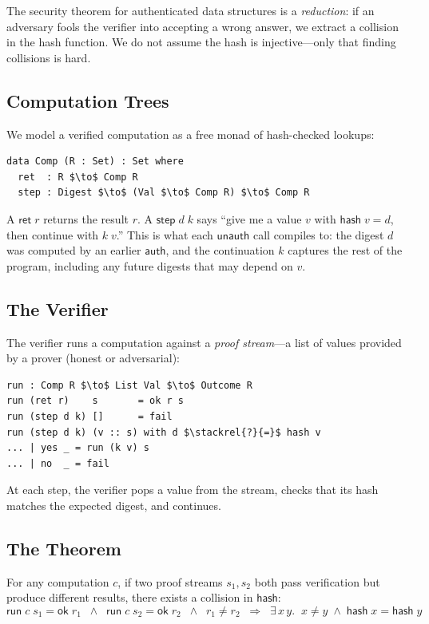 \documentclass[acmsmall,screen,review,anonymous]{acmart}
\begin{document}
The security theorem for authenticated data structures is a
\emph{reduction}: if an adversary fools the verifier into accepting a
wrong answer, we extract a collision in the hash function.  We do not
assume the hash is injective---only that finding collisions is hard.

\subsection{Computation Trees}

We model a verified computation as a free monad of hash-checked
lookups:
%
\begin{lstlisting}
data Comp (R : Set) : Set where
  ret  : R $\to$ Comp R
  step : Digest $\to$ (Val $\to$ Comp R) $\to$ Comp R
\end{lstlisting}
%
A $\mathsf{ret}\;r$ returns the result $r$.  A
$\mathsf{step}\;d\;k$ says ``give me a value $v$ with
$\mathsf{hash}\;v = d$, then continue with $k\;v$.''  This is what
each $\mathsf{unauth}$ call compiles to: the digest $d$ was computed
by an earlier $\mathsf{auth}$, and the continuation $k$ captures the
rest of the program, including any future digests that may depend on
$v$.

\subsection{The Verifier}

The verifier runs a computation against a \emph{proof stream}---a list
of values provided by a prover (honest or adversarial):
%
\begin{lstlisting}
run : Comp R $\to$ List Val $\to$ Outcome R
run (ret r)    s       = ok r s
run (step d k) []      = fail
run (step d k) (v :: s) with d $\stackrel{?}{=}$ hash v
... | yes _ = run (k v) s
... | no  _ = fail
\end{lstlisting}
%
At each step, the verifier pops a value from the stream, checks that
its hash matches the expected digest, and continues.

\subsection{The Theorem}

\begin{theorem}\label{thm:extraction}
For any computation $c$, if two proof streams $s_1, s_2$ both pass
verification but produce different results, there exists a collision
in $\mathsf{hash}$:
\[
  \mathsf{run}\;c\;s_1 = \mathsf{ok}\;r_1
  \;\;\wedge\;\;
  \mathsf{run}\;c\;s_2 = \mathsf{ok}\;r_2
  \;\;\wedge\;\;
  r_1 \neq r_2
  \;\;\Longrightarrow\;\;
  \exists\, x\,y.\;\; x \neq y \;\wedge\; \mathsf{hash}\;x = \mathsf{hash}\;y
\]
\end{theorem}
\end{document}
